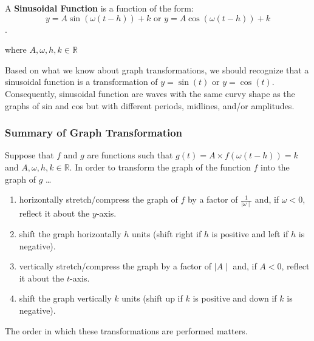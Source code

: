 \label{les_8:sinusoidal_functions}

\begin{definition}
  \label{def:sinusoidal_function}

  A \textbf{Sinusoidal Function} is a function of the form:
  \[ y = A\sin(\omega(t - h)) + k \textrm{ or } y = A\cos(\omega(t - h)) + k \].

  where $A, \omega, h, k \in \mathbb{R}$
\end{definition}

Based on what we know about graph transformations, we should recognize that a
sinusoidal function is a transformation of $y = \sin(t)$ or $y = \cos(t)$.
Consequently, sinusoidal function are waves with the same curvy shape as the
graphs of sin and cos but with different periods, midlines, and/or amplitudes.

\subsubsection*{Summary of Graph Transformation}
\label{sub_sub_sec:summary_of_graph_transformation}

Suppose that $f$ and $g$ are functions such that
$g(t) = A \times f(\omega(t - h)) = k$ and $A, \omega, h, k \in \mathbb{R}$. In
order to transform the graph of the function $f$ into the graph of $g$ \ldots

\begin{enumerate}
  \label{enum:steps_to_transform_f_to_g}

  \item horizontally stretch/compress the graph of $f$ by a factor of
    $\frac{1}{\mid \omega \mid}$ and, if $\omega < 0$, reflect it about the
    $y$-axis.
  \item shift the graph horizontally $h$ units (shift right if $h$ is positive
    and left if $h$ is negative).
  \item vertically stretch/compress the graph by a factor of $\mid A \mid$ and,
    if $A < 0$, reflect it about the $t$-axis.
  \item shift the graph vertically $k$ units (shift up if $k$ is positive and
    down if $k$ is negative).
\end{enumerate}

\begin{note}
  The order in which these transformations are performed matters.
\end{note}

